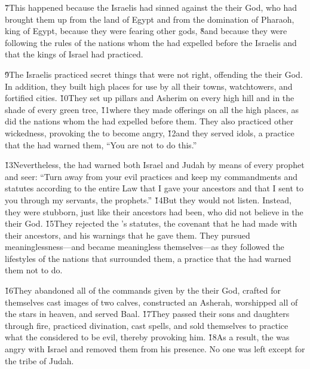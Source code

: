 \v{7}This happened because the Israelis had sinned against the  their God, who had brought them up from the land of Egypt and from the domination of Pharaoh, king of Egypt, because they were fearing other gods, \v{8}and because they were following the rules of the nations whom the  had expelled before the Israelis and that the kings of Israel had practiced.

\v{9}The Israelis practiced secret things that were not right, offending the  their God. In addition, they built high places for use by all their towns, watchtowers, and fortified cities. \v{10}They set up pillars and Asherim on every high hill and in the shade of every green tree, \v{11}where they made offerings on all the high places, as did the nations whom the  had expelled before them. They also practiced other wickedness, provoking the  to become angry, \v{12}and they served idols, a practice that the  had warned them, ``You are not to do this.''

\v{13}Nevertheless, the  had warned both Israel and Judah by means of every prophet and seer: ``Turn away from your evil practices and keep my commandments and statutes according to the entire Law that I gave your ancestors and that I sent to you through my servants, the prophets.'' \v{14}But they would not listen. Instead, they were stubborn, just like their ancestors had been, who did not believe in the  their God. \v{15}They rejected the 's statutes, the covenant that he had made with their ancestors, and his warnings that he gave them. They pursued meaninglessness---and became meaningless themselves---as they followed the lifestyles of the nations that surrounded them, a practice that the  had warned them not to do.

\v{16}They abandoned all of the commands given by the  their God, crafted for themselves cast images of two calves, constructed an Asherah, worshipped all of the stars in heaven, and served Baal. \v{17}They passed their sons and daughters through fire, practiced divination, cast spells, and sold themselves to practice what the  considered to be evil, thereby provoking him. \v{18}As a result, the  was angry with Israel and removed them from his presence. No one was left except for the tribe of Judah.


